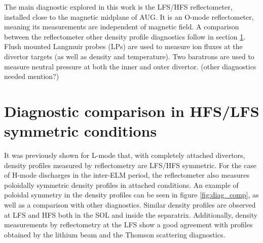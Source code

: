 \documentclass[12pt]{iopart}
\begin{document}
The main diagnostic explored in this work is the LFS/HFS reflectometer\cite{Silva1996}, installed close to the magnetic midplane of AUG. It is an O-mode reflectometer, meaning its measurements are independent of magnetic field. A comparison between the reflectometer other density profile diagnostics follow in section \ref{section:hfslfscomphmode}. Flush mounted Langmuir probes (LPs)\cite{weinlich1996flush} are used to measure ion fluxes at the divertor targets (as well as density and temperature). Two baratrons are used to measure neutral pressure at both the inner and outer divertor. (other diagnostics needed mention?)

\section{Diagnostic comparison in HFS/LFS symmetric conditions}
\label{section:hfslfscomphmode}

It was previously shown for L-mode that, with completely attached divertors, density profiles measured by reflectometry are LFS/HFS symmetric\cite{guimarais2017poloidal}. For the case of H-mode discharges in the inter-ELM period, the reflectometer also measures poloidally symmetric density profiles in attached conditions.
An example of poloidal symmetry in the density profiles can be seen in figure \ref{fig:diag_comp}, as well as a comparison with other diagnostics. Similar density profiles are observed at LFS and HFS both in the SOL and inside the separatrix. Additionally, density measurements by reflectometry at the LFS show a good agreement with profiles obtained by the lithium beam\cite{Willensdorfer2014characterization} and the Thomson scattering\cite{kurzan2011edge} diagnostics. 
\end{document}
